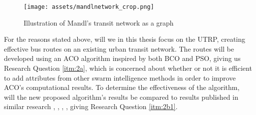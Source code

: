 \begin{figure}[H]
\begin{center}
  \texttt{[image: assets/mandlnetwork\_crop.png]}
  \end{center}
  \caption{Illustration of Mandl's transit network as a graph}
  \label{fig:MandlNetwork_problemstatement} 
\end{figure}



For the reasons stated above, will we in this thesis focus on the UTRP, creating effective bus routes on an existing urban transit network. The routes will be developed using an ACO algorithm inspired by both BCO and PSO, giving us Research Question \vref{itm:2a}, which is concerned about whether or not it is efficient to add attributes from other swarm intelligence methods in order to improve ACO's computational results. To determine the effectiveness of the algorithm, will the new proposed algorithm's results be compared to results published in similar research \citep{kechagiopoulos14}, \citep{mandl79}, \citep{fan09}, \citep{nikolic14}, giving Research Question \vref{itm:2b1}. 

